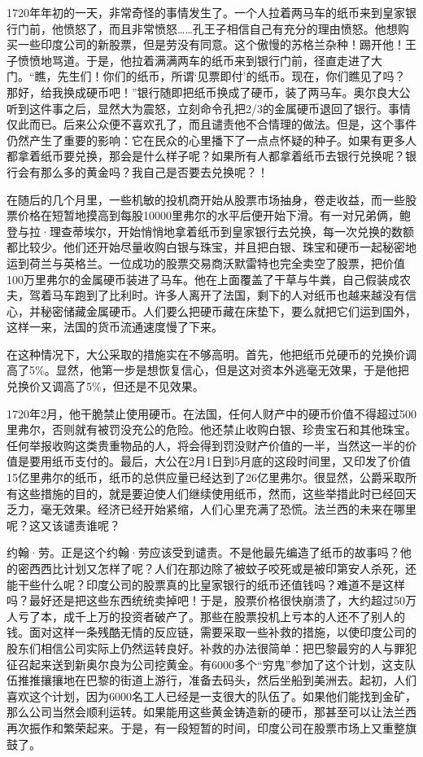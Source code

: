 \documentclass[12pt,oneside]{book}
\begin{document}
1720年年初的一天，非常奇怪的事情发生了。一个人拉着两马车的纸币来到皇家银行门前，他愤怒了，而且非常愤怒……孔王子相信自己有充分的理由愤怒。他想购买一些印度公司的新股票，但是劳没有同意。这个傲慢的苏格兰杂种！踢开他！王子愤愤地骂道。于是，他拉着满满两车的纸币来到银行门前，径直走进了大门。“瞧，先生们！你们的纸币，所谓‘见票即付’的纸币。现在，你们瞧见了吗？那好，给我换成硬币吧！”银行随即把纸币换成了硬币，装了两马车。奥尔良大公听到这件事之后，显然大为震怒，立刻命令孔把2/3的金属硬币退回了银行。事情仅此而已。后来公众便不喜欢孔了，而且谴责他不合情理的做法。但是，这个事件仍然产生了重要的影响：它在民众的心里播下了一点点怀疑的种子。如果有更多人都拿着纸币要兑换，那会是什么样子呢？如果所有人都拿着纸币去银行兑换呢？银行会有那么多的黄金吗？我自己是否要去兑换呢？！

在随后的几个月里，一些机敏的投机商开始从股票市场抽身，卷走收益，而一些股票价格在短暂地摸高到每股10000里弗尔的水平后便开始下滑。有一对兄弟俩，鲍登与拉·理查蒂埃尔，开始悄悄地拿着纸币到皇家银行去兑换，每一次兑换的数额都比较少。他们还开始尽量收购白银与珠宝，并且把白银、珠宝和硬币一起秘密地运到荷兰与英格兰。一位成功的股票交易商沃默雷特也完全卖空了股票，把价值100万里弗尔的金属硬币装进了马车。他在上面覆盖了干草与牛粪，自己假装成农夫，驾着马车跑到了比利时。许多人离开了法国，剩下的人对纸币也越来越没有信心，并秘密储藏金属硬币。人们要么把硬币藏在床垫下，要么就把它们运到国外，这样一来，法国的货币流通速度慢了下来。

在这种情况下，大公采取的措施实在不够高明。首先，他把纸币兑硬币的兑换价调高了5\%。显然，他第一步是想恢复信心，但是这对资本外逃毫无效果，于是他把兑换价又调高了5\%，但还是不见效果。

1720年2月，他干脆禁止使用硬币。在法国，任何人财产中的硬币价值不得超过500里弗尔，否则就有被罚没充公的危险。他还禁止收购白银、珍贵宝石和其他珠宝。任何举报收购这类贵重物品的人，将会得到罚没财产价值的一半，当然这一半的价值是要用纸币支付的。最后，大公在2月1日到5月底的这段时间里，又印发了价值15亿里弗尔的纸币，纸币的总供应量已经达到了26亿里弗尔。很显然，公爵采取所有这些措施的目的，就是要迫使人们继续使用纸币，然而，这些举措此时已经回天乏力，毫无效果。经济已经开始紧缩，人们心里充满了恐慌。法兰西的未来在哪里呢？这又该谴责谁呢？

约翰·劳。正是这个约翰·劳应该受到谴责。不是他最先编造了纸币的故事吗？他的密西西比计划又怎样了呢？人们在那边除了被蚊子咬死或是被印第安人杀死，还能干些什么呢？印度公司的股票真的比皇家银行的纸币还值钱吗？难道不是这样吗？最好还是把这些东西统统卖掉吧！于是，股票价格很快崩溃了，大约超过50万人亏了本，成千上万的投资者破产了。那些在股票投机上亏本的人还不了别人的钱。面对这样一条残酷无情的反应链，需要采取一些补救的措施，以使印度公司的股东们相信公司实际上仍然运转良好。补救的办法很简单：把巴黎最穷的人与罪犯征召起来送到新奥尔良为公司挖黄金。有6000多个“穷鬼”参加了这个计划，这支队伍推推攘攘地在巴黎的街道上游行，准备去码头，然后坐船到美洲去。起初，人们喜欢这个计划，因为6000名工人已经是一支很大的队伍了。如果他们能找到金矿，那么公司当然会顺利运转。如果能用这些黄金铸造新的硬币，那甚至可以让法兰西再次振作和繁荣起来。于是，有一段短暂的时间，印度公司在股票市场上又重整旗鼓了。
\end{document}
